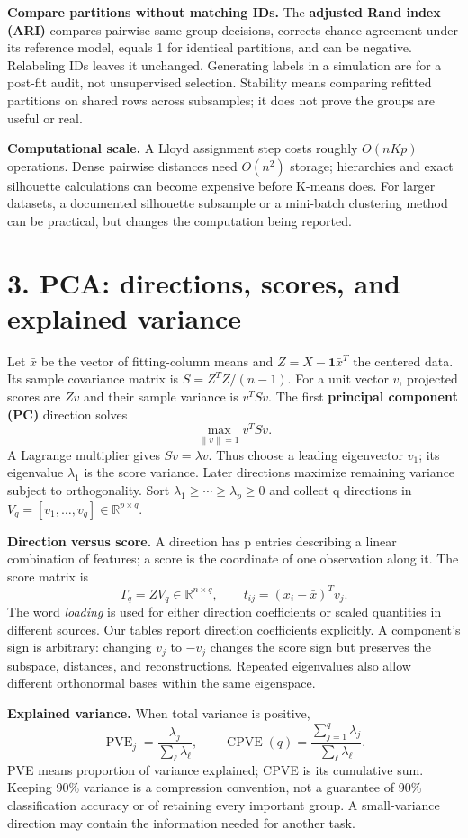 \documentclass[11pt,a4paper]{article}
\begin{document}
\textbf{Compare partitions without matching IDs.} The \textbf{adjusted Rand index (ARI)} compares pairwise
same-group decisions, corrects chance agreement under its reference model, equals 1 for identical partitions,
and can be negative. Relabeling IDs leaves it unchanged. Generating labels in a simulation are for a post-fit audit,
not unsupervised selection. Stability means comparing refitted partitions on shared rows across subsamples;
it does not prove the groups are useful or real.


\textbf{Computational scale.} A Lloyd assignment step costs roughly $O(nKp)$ operations.
Dense pairwise distances need $O(n^2)$ storage; hierarchies and exact silhouette calculations can become expensive
before K-means does. For larger datasets, a documented silhouette subsample or a mini-batch clustering method
can be practical, but changes the computation being reported.

\newpage
\section*{3. PCA: directions, scores, and explained variance}
Let $\bar x$ be the vector of fitting-column means and $Z=X-\mathbf1\bar x^T$ the centered data.
Its sample covariance matrix is $S=Z^TZ/(n-1)$.
For a unit vector $v$, projected scores are $Zv$ and their sample variance is $v^TSv$.
The first \textbf{principal component (PC)} direction solves
\[
\boxed{\max_{\|v\|=1}v^TSv.}
\]
A Lagrange multiplier gives $Sv=\lambda v$. Thus choose a leading eigenvector $v_1$;
its eigenvalue $\lambda_1$ is the score variance. Later directions maximize remaining variance subject to
orthogonality. Sort $\lambda_1\ge\cdots\ge\lambda_p\ge0$ and collect q directions in
$V_q=[v_1,\ldots,v_q]\in\mathbb R^{p\times q}$.

\textbf{Direction versus score.} A direction has p entries describing a linear combination of features;
a score is the coordinate of one observation along it. The score matrix is
\[
\boxed{T_q=ZV_q\in\mathbb R^{n\times q},\qquad t_{ij}=(x_i-\bar x)^Tv_j.}
\]
The word \emph{loading} is used for either direction coefficients or scaled quantities in different sources.
Our tables report direction coefficients explicitly. A component's sign is arbitrary: changing $v_j$ to $-v_j$
changes the score sign but preserves the subspace, distances, and reconstructions. Repeated eigenvalues also
allow different orthonormal bases within the same eigenspace.

\textbf{Explained variance.} When total variance is positive,
\[
\operatorname{PVE}_j=\frac{\lambda_j}{\sum_\ell\lambda_\ell},\qquad
\operatorname{CPVE}(q)=\frac{\sum_{j=1}^q\lambda_j}{\sum_\ell\lambda_\ell}.
\]
PVE means proportion of variance explained; CPVE is its cumulative sum.
Keeping 90\% variance is a compression convention, not a guarantee of 90\% classification accuracy
or of retaining every important group. A small-variance direction may contain the information needed for another task.
\end{document}
